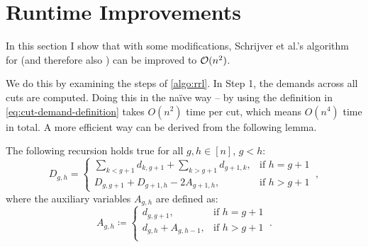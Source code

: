 \section{Runtime Improvements}
\label{sec:runtime}

In this section I show that with some modifications, Schrijver et al.'s \cite{schrijver99} algorithm for \RRL (and therefore also \RL) can be improved to $\mathcal{O}(n^2)$.

We do this by examining the steps of \cref{algo:rrl}.
In Step 1, the demands across all cuts are computed.
Doing this in the naïve way -- by using the definition in \cref{eq:cut-demand-definition} takes $O(n^2)$ time per cut, which means $O(n^4)$ time in total.
A more efficient way can be derived from the following lemma.
\begin{lemma}
	The following recursion holds true for all $g, h \in [n]$, $g < h$:
	\begin{equation}
		\label{eq:recursive-dac}
		D_{g, h} = \begin{cases}
			\sum_{k < g+1} d_{k,g+1} + \sum_{k > g+1} d_{g+1, k}, & \text{if } h = g+1 \\
			D_{g, g+1} + D_{g+1, h} - 2 A_{g+1, h}, & \text{if } h > g+1
		\end{cases} \ ,
	\end{equation}
	where the auxiliary variables $A_{g, h}$ are defined as:
	\begin{equation}
		A_{g, h} \coloneqq \begin{cases}
			d_{g, g+1}, & \text{if } h = g+1\\
			d_{g, h} + A_{g, h-1}, &\text{if } h > g+1\\
		\end{cases} \ .
	\end{equation}
\end{lemma}
